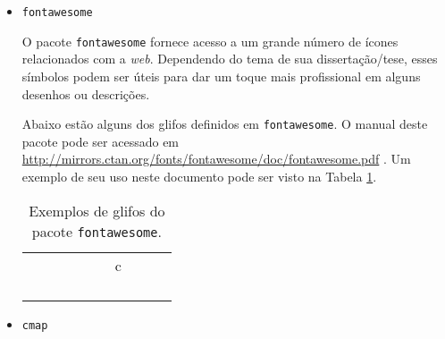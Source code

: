 \begin{itemize}
\item \texttt{fontawesome}

O pacote \texttt{fontawesome} fornece acesso a um grande número de ícones relacionados com a \textit{web}. Dependendo do tema de sua dissertação/tese, esses símbolos podem ser úteis para dar um toque mais profissional em alguns desenhos ou descrições.



Abaixo estão alguns dos glifos definidos em \texttt{fontawesome}. O manual deste pacote pode ser acessado em 
\url{http://mirrors.ctan.org/fonts/fontawesome/doc/fontawesome.pdf} \parencite{fontawesome}. Um exemplo de seu uso neste documento pode ser visto na Tabela \ref{tab:fontawesome}.

\begin{table}[htb]
	\begin{center}
	\begin{tabular}{|c|c|c|c|c|c|c|c|c|c|}
		\hline
		\faBattery[0] & \faBattery[1] & \faBattery[2] & \faBattery[3] & \faBattery[4] & \faBarChart & \faBarcode & \faBluetooth & \faBeer & \faCalculator \\ \hline \faCalendar & \faClockO & \faClone & \faCloudDownload & \faCloudDownload & \faCodeFork &c\faCopy & \faCopyright & \faCreativeCommons & \faHotel \\ \hline
		\faFolder & \faFolderOpen & \faFolderO & \faFolderOpenO & \faGears & \faDesktop & \faLaptop & \faMobile & \faFile & \faFilePdfO \\ \hline 
		\faFilePhotoO & \faFilePowerpointO & \faFileSoundO & \faFileSoundO & \faFileTextO & \faFileVideoO & \faFileWordO & \faFileZipO & \faFilm & \faRebel \\ \hline
		\faAndroid & \faGoogle & \faAmazon & \faOpera & \faGithub & \faGitlab & \faFacebook & \faChrome & \faInstagram & \faInternetExplorer  \\ \hline 
		\faJoomla &	\faLinux & \faApple & \faSafari & \faSkype &  \faSnapchat & \faSpotify & \faTwitter & \faWikipediaW & \faWindows \\ \hline
	\end{tabular}
    \end{center}
    \caption{Exemplos de glifos do pacote \texttt{fontawesome}.}
    \label{tab:fontawesome}
\end{table}

\item \texttt{cmap}


\end{itemize}
